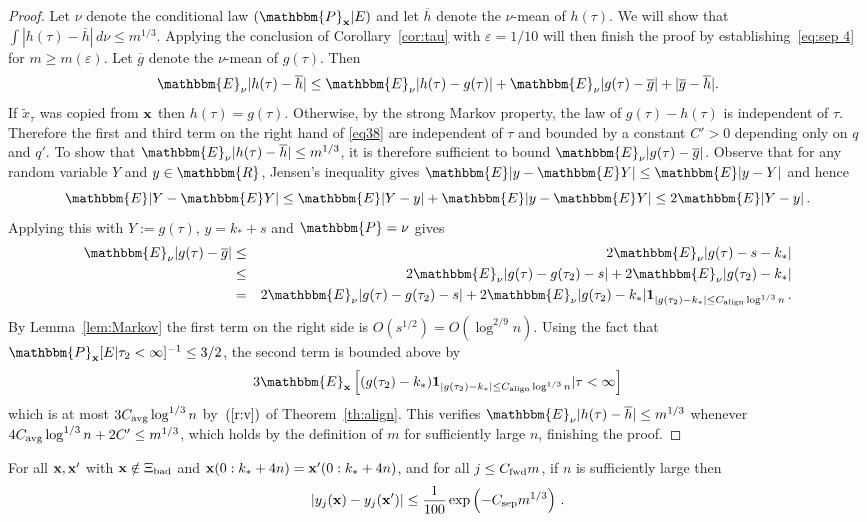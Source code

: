 \documentclass[final,12pt]{colt2018} %
\newcommand{\E}{\mathbbm{E}}
\newcommand{\R}{\mathbbm{R}}
\renewcommand{\P}{\mathbbm{P}}
\newcommand{\1}{\mathbf{1}}
\newcommand{\eqb}{\begin{equation}}
\newcommand{\eqe}{\end{equation}}
\newcommand{\wt}{\widetilde}
\def\x{{\bf x}}
\def\ee{\varepsilon}
\def\csep{C_{\rm sep}} %
\def\cfwd{C_{\rm fwd}} %
\def\calign{C_{\rm align}}
\def\cavg{C_{\rm avg}}
\def\bad{{\Xi_{\rm bad}}}
\def\nubar{\overline{g}}
\def\nubarh{\overline{h}}
\begin{document}
\begin{proof}
	Let $\nu$ denote the conditional law $(\P_\x | E)$ and let $\nubarh$ denote the $\nu$-mean of $h(\tau)$.  We will show that$\int | h(\tau) - \nubarh| \, d\nu \leq m^{1/3}$. Applying the conclusion of Corollary~\ref{cor:tau} with $\ee = 1/10$ will then finish the proof by establishing~\eqref{eq:sep 4} for $m \geq m(\ee)$. Let $\nubar$ denote the $\nu$-mean of $g(\tau)$. Then
	\eqb
	\E_\nu|h(\tau)-\nubarh| \leq \E_\nu|h(\tau)-g(\tau)|+\E_\nu|g(\tau)-\nubar|+|\nubar-\nubarh|.
	\label{eq38}
	\eqe
	If $\wt x_\tau$ was copied from $\x$ then $h(\tau)=g(\tau)$. Otherwise, by the strong Markov property, the law of $g(\tau)-h(\tau)$ is independent of $\tau$. Therefore the first and third term on the right hand of \eqref{eq38} are independent of $\tau$ and bounded by a constant $C'>0$ depending only on $q$ and $q'$. To show that $\E_\nu |h(\tau) - \nubarh| \leq m^{1/3}$, it is therefore sufficient to bound $\E_\nu|g(\tau)-\nubar|$.  Observe
	that for any random variable $Y$ and $y \in \R$, Jensen's inequality
	gives $\E |y - \E Y| \leq \E |y - Y|$ and hence
	$$\E |Y - \E Y| \leq \E |Y - y| + \E |y - \E Y| \leq 2 \E |Y - y| \, .$$
	Applying this with $Y := g(\tau)$, $y = k_* + s$ and $\P = \nu$ gives
	\begin{eqnarray}
	\E_\nu |g(\tau) - \nubar| & \leq & 2 \E_\nu |g(\tau) - s - k_*| \nonumber \\
	& \leq & 2 \E_\nu |g(\tau) - g(\tau_2) - s| + 2 \E_\nu |g(\tau_2) - k_*|
	\nonumber \\
	& = & 2 \E_\nu |g(\tau) - g(\tau_2) - s|
	+ 2 \E_\nu |g(\tau_2) - k_*|
	\1_{|g(\tau_2) - k_*| \leq \calign \log^{1/3} n}
	\label{eq:two}\, .
	\end{eqnarray}
	By Lemma~\ref{lem:Markov} the first term on the right side is $O(s^{1/2})
	= O(\log^{2/9} n)$.  Using the fact that
	$\P_{\x} [E | \tau_2 < \infty]^{-1} \leq 3/2$,
	the second term is bounded above by
	$$3 \E_\x \left [ (g(\tau_2) - k_*) \1_{|g(\tau_2) - k_*|
		\leq \calign \log^{1/3} n} | \tau < \infty \right ]$$
	which is at most $3 \cavg \log^{1/3} n$ by~$(\ref{r:v})$ of Theorem~\ref{th:align}.
	This verifies $\E_\nu |h(\tau) - \nubarh| \leq m^{1/3}$ whenever
	$4 \cavg \log^{1/3} n+2C' \leq m^{1/3}$, which holds by the definition of $m$ for sufficiently large $n$, finishing the proof.
\end{proof}

\begin{lemma} \label{lem:4n}
	For all $\x, \x'$ with $\x \notin \bad$ and
	$\x(0:k_* + 4n) = \x'(0:k_* + 4n)$, and for all $j \leq \cfwd m$, if
	$n$ is sufficiently large then
	\eqb \label{eq:sep 5}
	\left | y_j (\x) - y_j (\x') \right | \leq \frac{1}{100}
	\exp \left ( - \csep m^{1/3} \right ) \, .
	\eqe
\end{lemma}
\end{document}
